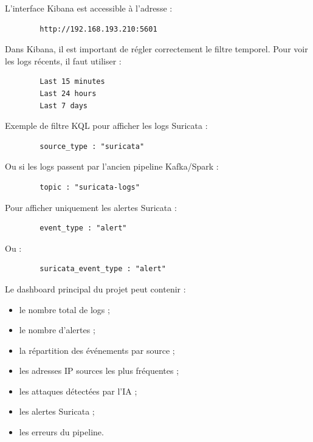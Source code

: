 \documentclass[12pt,a4paper,oneside]{report}
\begin{document}
    L'interface Kibana est accessible à l'adresse :
    
    \begin{lstlisting}
    	http://192.168.193.210:5601
    \end{lstlisting}
    
    Dans Kibana, il est important de régler correctement le filtre temporel. Pour voir les logs récents, il faut utiliser :
    
    \begin{lstlisting}
    	Last 15 minutes
    	Last 24 hours
    	Last 7 days
    \end{lstlisting}
    
    Exemple de filtre KQL pour afficher les logs Suricata :
    
    \begin{lstlisting}
    	source_type : "suricata"
    \end{lstlisting}
    
    Ou si les logs passent par l'ancien pipeline Kafka/Spark :
    
    \begin{lstlisting}
    	topic : "suricata-logs"
    \end{lstlisting}
    
    Pour afficher uniquement les alertes Suricata :
    
    \begin{lstlisting}
    	event_type : "alert"
    \end{lstlisting}
    
    Ou :
    
    \begin{lstlisting}
    	suricata_event_type : "alert"
    \end{lstlisting}
    
    Le dashboard principal du projet peut contenir :
    
    \begin{itemize}
    	\item le nombre total de logs ;
    	\item le nombre d'alertes ;
    	\item la répartition des événements par source ;
    	\item les adresses IP sources les plus fréquentes ;
    	\item les attaques détectées par l'IA ;
    	\item les alertes Suricata ;
    	\item les erreurs du pipeline.
    \end{itemize}
    
\end{document}
